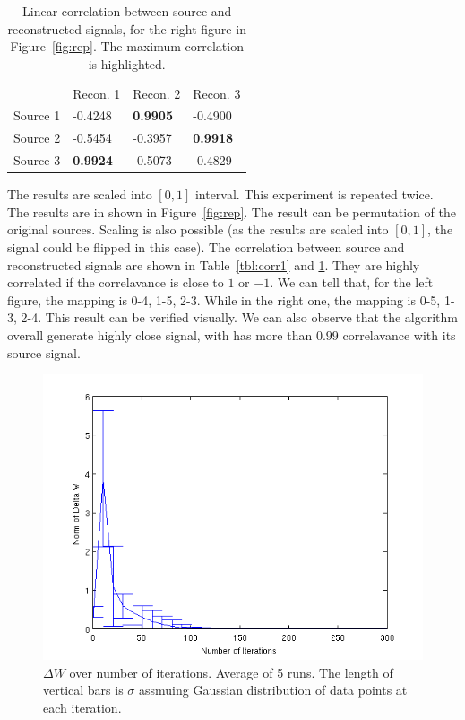 \documentclass[10pt]{article}
\begin{document}
\begin{table}
\centering
\begin{tabular}{ | l l l l | }
\hline
& Recon. 1& Recon. 2& Recon. 3\\
Source 1&-0.4248& \textbf{0.9905}&-0.4900\\
Source 2&-0.5454&-0.3957& \textbf{0.9918}\\
Source 3&\textbf{0.9924}&-0.5073&-0.4829\\
\hline
\end{tabular}
\caption{Linear correlation between source and reconstructed signals, for
the right figure in Figure~\ref{fig:rep}. The maximum correlation is
highlighted.}
\label{tbl:corr2}
\end{table}

The results are scaled into $[0, 1]$ interval. This experiment is repeated
twice.  The results are in shown in Figure~\ref{fig:rep}. The result can be
permutation of the original sources. Scaling is also possible (as the
results are scaled into $[0, 1]$, the signal could be flipped in this
case). The correlation between source and reconstructed signals are shown in
Table~\ref{tbl:corr1} and \ref{tbl:corr2}. They are highly correlated if
the correlavance is close to $1$ or $-1$. We can tell that, for the left figure,
the mapping is 0-4, 1-5, 2-3. While in the right one, the mapping is 0-5,
1-3, 2-4. This result can be verified visually. We can also observe that
the algorithm overall generate highly close signal, with has more than
$0.99$ correlavance with its source signal.

\begin{figure}
\centering
\includegraphics[width=.6\textwidth]{detW.png}
\caption{$\Delta W$ over number of iterations. Average of 5 runs. The
length of vertical bars is $\sigma$ assmuing Gaussian distribution of data
points at each iteration.}
\label{fig:detW}
\end{figure}
\end{document}
